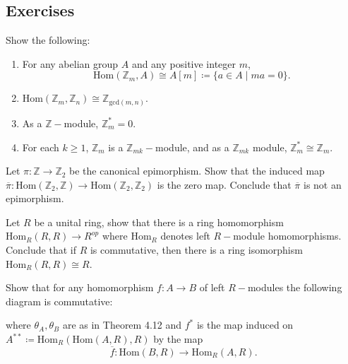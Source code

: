 \subsection{Exercises}

\begin{problem}[Hungerford 4.4.1]
\label{prob:1.1}
Show the following:
\begin{enumerate}
    \item For any abelian group $A$ and any positive integer $m$,
    $$
    \mathrm{Hom}(\mathbb{Z}_m, A) \cong A[m] \coloneqq \{ a\in A \mid ma = 0\}.
    $$
    \item $\mathrm{Hom}(\mathbb{Z}_m, \mathbb{Z}_n) \cong \mathbb{Z}_{\mathrm{gcd}(m,n)}$.
    \item As a $\mathbb{Z}-$module, $\mathbb{Z}_m^* = 0$.
    \item For each $k\geq 1$, $\mathbb{Z}_m$ is a $\mathbb{Z}_{mk}-$module, and as a $\mathbb{Z}_{mk}$ module, $\mathbb{Z}_m^* \cong \mathbb{Z}_m$.
\end{enumerate}
\end{problem}

\begin{problem}[Hungerford 4.4.3]
\label{prob:1.1}
Let $\pi: \mathbb{Z} \to \mathbb{Z}_2$ be the canonical epimorphism. Show that the induced map $\overline{\pi}: \mathrm{Hom}(\mathbb Z_2, \mathbb Z) \to \mathrm{Hom}(\mathbb Z_2, \mathbb Z_2)$ is the zero map. Conclude that $\overline{\pi}$ is not an epimorphism.
\end{problem}

\begin{problem}[Hungerford 4.4.5]
\label{prob:1.1}
Let $R$ be a unital ring, show that there is a ring homomorphism $\mathrm{Hom}_R(R, R) \to R^{op}$ where $\mathrm{Hom}_R$ denotes left $R-$module homomorphisms. Conclude that if $R$ is commutative, then there is a ring isomorphism $\mathrm{Hom}_R(R, R) \cong R$.
\end{problem}

\begin{problem}[Hungerford 4.4.9]
\label{prob:1.1}
Show that for any homomorphism $f: A \to B$ of left $R-$modules the following diagram is commutative:

\begin{center}
\end{center}

where $\theta_A, \theta_B$ are as in Theorem 4.12 and $f^*$ is the map induced on $A^{**} \coloneqq \mathrm{Hom}_R(\mathrm{Hom}(A, R), R)$ by the map $$\overline f: \mathrm{Hom}(B, R) \to \mathrm{Hom}_R(A, R).$$
\end{problem}


